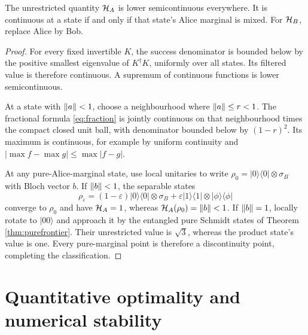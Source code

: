 \begin{theorem}\label{thm:continuitylocus}
The unrestricted quantity $\mathcal H_A$ is lower semicontinuous everywhere.
It is continuous at a state if and only if that state's Alice marginal
is mixed. For $\mathcal H_B$, replace Alice by Bob.
\end{theorem}
\begin{proof}
For every fixed invertible $K$, the success denominator is bounded below
by the positive smallest eigenvalue of $K^\dagger K$, uniformly over all
states. Its filtered value is therefore continuous. A supremum of
continuous functions is lower semicontinuous.

At a state with $\left\lVert a\right\rVert<1$, choose a neighbourhood where
$\left\lVert a\right\rVert\leq r<1$. The fractional formula \eqref{eq:fraction} is jointly
continuous on that neighbourhood times the compact closed unit ball,
with denominator bounded below by $(1-r)^2$. Its maximum is continuous,
for example by uniform continuity and
$|\max f-\max g|\leq\max|f-g|$.

At any pure-Alice-marginal state, use local unitaries to write
$\rho_0=|0\rangle\langle0|\otimes\sigma_B$ with Bloch vector $b$.
If $\left\lVert b\right\rVert<1$, the separable states
\[
 \rho_\varepsilon=(1-\varepsilon)|0\rangle\langle0|\otimes\sigma_B
 +\varepsilon|1\rangle\langle1|\otimes|\phi\rangle\langle\phi|
\]
converge to $\rho_0$ and have $\mathcal H_A=1$, whereas
$\mathcal H_A(\rho_0)=\left\lVert b\right\rVert<1$. If $\left\lVert b\right\rVert=1$, locally rotate to
$|00\rangle$ and approach it by the entangled pure Schmidt states of
Theorem \ref{thm:purefrontier}. Their unrestricted value is $\sqrt3$,
whereas the product state's value is one. Every pure-marginal point is
therefore a discontinuity point, completing the classification.
\end{proof}

\section{Quantitative optimality and numerical stability}


